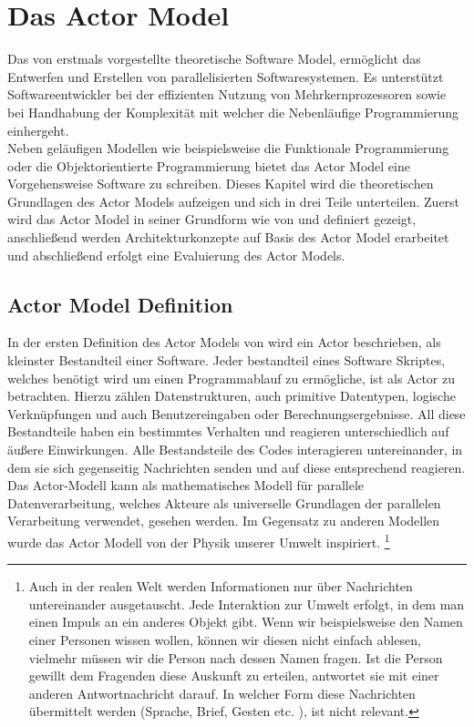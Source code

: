 \chapter{Das Actor Model}
Das von \cite{hewitt1973session} erstmals vorgestellte theoretische Software Model, ermöglicht das Entwerfen und Erstellen von parallelisierten Softwaresystemen. Es unterstützt Softwareentwickler bei der effizienten Nutzung von Mehrkernprozessoren sowie bei Handhabung der  Komplexität mit welcher die Nebenläufige Programmierung einhergeht.   
\\
Neben geläufigen Modellen wie beispielsweise die Funktionale Programmierung oder die Objektorientierte Programmierung bietet das Actor Model eine Vorgehensweise Software zu schreiben. Dieses Kapitel wird die theoretischen Grundlagen des Actor Models aufzeigen und sich in drei Teile unterteilen. Zuerst wird das Actor Model in seiner Grundform wie von \cite{hewitt1973session} und \cite{Agha1985ActorsSystems} definiert gezeigt, anschließend werden Architekturkonzepte auf Basis des Actor Model erarbeitet und abschließend erfolgt eine Evaluierung des Actor Models.

\section{Actor Model Definition}
In der ersten Definition des Actor Models von \citep{hewitt1973session} wird ein Actor beschrieben, als kleinster Bestandteil einer Software. Jeder bestandteil eines Software Skriptes, welches benötigt wird um einen Programmablauf zu ermögliche, ist als Actor zu betrachten. Hierzu zählen Datenstrukturen, auch primitive Datentypen, logische Verknüpfungen und auch Benutzereingaben oder Berechnungsergebnisse. All diese Bestandteile haben ein bestimmtes Verhalten und reagieren unterschiedlich auf äußere Einwirkungen. Alle Bestandsteile des Codes interagieren untereinander, in dem sie sich gegenseitig Nachrichten senden und auf diese entsprechend reagieren.\\
Das Actor-Modell kann als mathematisches Modell für parallele Datenverarbeitung, welches Akteure als universelle Grundlagen der parallelen Verarbeitung verwendet, gesehen werden. Im Gegensatz zu anderen Modellen wurde das Actor Modell von der Physik unserer Umwelt inspiriert. \footnote{Auch in der realen Welt werden Informationen nur über Nachrichten untereinander ausgetauscht. Jede Interaktion zur Umwelt erfolgt, in dem man einen Impuls an ein anderes Objekt gibt. Wenn wir beispielsweise den Namen einer Personen wissen wollen, können wir diesen nicht einfach ablesen, vielmehr müssen wir die Person nach dessen Namen fragen. Ist die Person gewillt dem Fragenden diese Auskunft zu erteilen, antwortet sie mit einer anderen Antwortnachricht darauf. In welcher Form diese Nachrichten übermittelt werden (Sprache, Brief, Gesten etc. ), ist nicht relevant.} \citep{Vernon2015ReactiveAkka}

